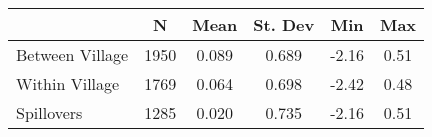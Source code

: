 \begin{tabular}{l*{5}{c}}\hline&\multicolumn{1}{c}{N}&\multicolumn{1}{c}{Mean}&\multicolumn{1}{c}{St. Dev}&\multicolumn{1}{c}{Min}&\multicolumn{1}{c}{Max}\\ \hline 
Between Village & 1950 & 0.089 & 0.689 & -2.16 & 0.51 \\
Within Village & 1769 & 0.064 & 0.698 & -2.42 & 0.48 \\
Spillovers & 1285 & 0.020 & 0.735 & -2.16 & 0.51 \\
\hline \end{tabular}
